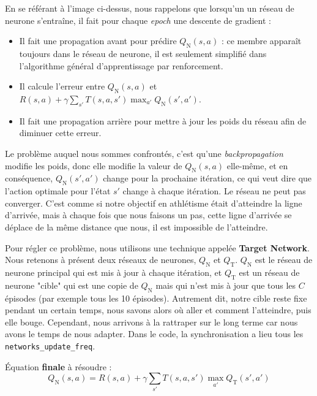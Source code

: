\documentclass{article}
\begin{document}
En se référant à l'image ci-dessus, nous rappelons que lorsqu'un un réseau de neurone s'entraîne, il fait pour chaque \textit{epoch} une descente de gradient :
\begin{itemize}
    \item Il fait une propagation avant pour prédire $Q_\text{N}(s, a)$ : ce membre apparaît toujours dans le réseau de neurone,
    il est seulement simplifié dans l'algorithme général d'apprentissage par renforcement.
    \item Il calcule l'erreur entre $Q_\text{N}(s, a)$ et $R(s, a) + \gamma \sum_{s'} T(s, a, s') \max_{a'} Q_\text{N}(s', a')$.
    \item Il fait une propagation arrière pour mettre à jour les poids du réseau afin de diminuer cette erreur.
\end{itemize}

\vspace{0.5cm}

Le problème auquel nous sommes confrontés, c'est qu'une \textit{backpropagation} modifie les poids, donc elle modifie la valeur de $Q_\text{N}(s, a)$ elle-même, et en conséquence,
$Q_\text{N}(s', a')$ change pour la prochaine itération, ce qui veut dire que l'action optimale pour l'état $s'$ change à chaque itération.
Le réseau ne peut pas converger.
C'est comme si notre objectif en athlétisme était d'atteindre la ligne d'arrivée, mais à chaque fois que nous faisons un pas, 
cette ligne d'arrivée se déplace de la même distance que nous, il est impossible de l'atteindre.

\vspace{0.5cm}

Pour régler ce problème, nous utilisons une technique appelée \textbf{Target Network}.
Nous retenons à présent deux réseaux de neurones, $Q_\text{N}$ et $Q_\text{T}$. $Q_\text{N}$ est le réseau de neurone principal qui est mis à jour à chaque itération, 
et $Q_\text{T}$ est un réseau de neurone "cible" qui est une copie de $Q_\text{N}$ mais qui n'est mis à jour que tous les $C$ épisodes (par exemple tous les 10 épisodes).
Autrement dit, notre cible reste fixe pendant un certain temps, nous savons alors où aller et comment l'atteindre, puis elle bouge. Cependant, nous arrivons
à la rattraper sur le long terme car nous avons le temps de nous adapter.
Dans le code, la synchronisation a lieu tous les \texttt{networks\_update\_freq}.

\vspace{0.5cm}

Équation \textbf{finale} à résoudre :
$$Q_\text{N}(s, a) = R(s, a) + \gamma \sum_{s'} T(s, a, s') \max_{a'} Q_\text{T}(s', a')$$
\end{document}
